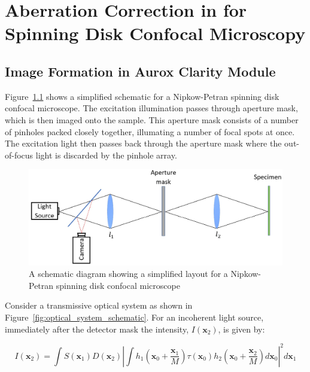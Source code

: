 \chapter{Aberration Correction in for Spinning Disk Confocal Microscopy}
\label{chpt:Aurox}

\section{Image Formation in Aurox Clarity Module}
\label{sec:Aurox_image_formation}

Figure~\ref{fig:confocal_schematic} shows a simplified schematic for a Nipkow-Petran spinning disk confocal microscope. The excitation illumination passes through aperture mask, which is then imaged onto the sample. This aperture mask consists of a number of pinholes packed closely together, illumating a number of focal spots at once. The excitation light then passes back through the aperture mask where the out-of-focus light is discarded by the pinhole array.\cite{egger1967new,fuseler2018types}

\begin{figure}[h]
	\centering
	\includegraphics[width=\textwidth]{images/confocal_schematic.jpg}
	\caption{A schematic diagram showing a simplified layout for a Nipkow-Petran spinning disk confocal microscope}
	\label{fig:confocal_schematic}
\end{figure}

Consider a transmissive optical system as shown in Figure~\ref{fig:optical_system_schematic}. For an incoherent light source, immediately after the detector mask the intensity, $I\left(\textbf{x}_{2}\right)$, is given by:

\begin{equation}\label{eq:intensity_after_detector}
	I\left(\textbf{x}_{2}\right) = \int S\left(\textbf{x}_{1}\right) D\left(\textbf{x}_{2}\right) \left| \int h_{1}\left(\textbf{x}_{0} + \frac{\textbf{x}_{1}}{M}\right) \tau\left(\textbf{x}_{0}\right) h_{2}\left(\textbf{x}_{0} + \frac{\textbf{x}_{2}}{M}\right)d\textbf{x}_{0}\right|^{2}d\textbf{x}_{1}
\end{equation}

